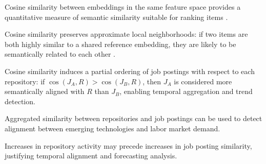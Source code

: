 \begin{argument}
{    %
    \item Cosine similarity between embeddings in the same feature space provides a quantitative measure of semantic similarity suitable for ranking items \cite{mikolov-2013-distributed, reimers-gurevych-2019-sentence}.
    \item Cosine similarity preserves approximate local neighborhoods: if two items are both highly similar to a shared reference embedding, they are likely to be semantically related to each other \cite{ethayarajh-2019-contextual}.
    \item Cosine similarity induces a partial ordering of job postings with respect to each repository: if $\cos(J_A, R) > \cos(J_B, R)$, then $J_A$ is considered more semantically aligned with $R$ than $J_B$, enabling temporal aggregation and trend detection.
    \item Aggregated similarity between repositories and job postings can be used to detect alignment between emerging technologies and labor market demand.
    \item Increases in repository activity may precede increases in job posting similarity, justifying temporal alignment and forecasting analysis.
  }
\end{argument}
